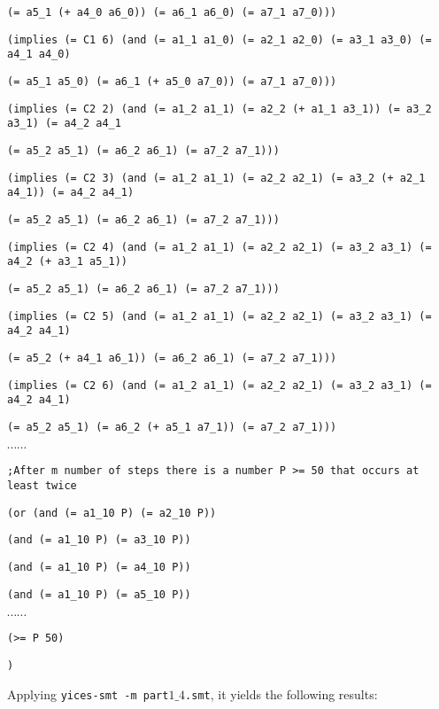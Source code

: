 {{\tt  (= a5\_1 (+ a4\_0 a6\_0)) (= a6\_1 a6\_0) (= a7\_1 a7\_0)))}

{\tt (implies (= C1 6)  (and (= a1\_1 a1\_0) (= a2\_1 a2\_0) (= a3\_1 a3\_0) (= a4\_1 a4\_0) }

{\tt (= a5\_1 a5\_0) (= a6\_1 (+ a5\_0 a7\_0)) (= a7\_1 a7\_0)))}

{\tt }

{\tt (implies (= C2 2)  (and (= a1\_2 a1\_1) (= a2\_2 (+ a1\_1 a3\_1)) (= a3\_2 a3\_1) (= a4\_2 a4\_1}

{\tt  (= a5\_2 a5\_1) (= a6\_2 a6\_1) (= a7\_2 a7\_1)))}

{\tt (implies (= C2 3)  (and (= a1\_2 a1\_1) (= a2\_2 a2\_1) (= a3\_2 (+ a2\_1 a4\_1)) (= a4\_2 a4\_1)}

{\tt  (= a5\_2 a5\_1) (= a6\_2 a6\_1) (= a7\_2 a7\_1)))}

{\tt (implies (= C2 4)  (and (= a1\_2 a1\_1) (= a2\_2 a2\_1) (= a3\_2 a3\_1) (= a4\_2 (+ a3\_1 a5\_1))}

{\tt (= a5\_2 a5\_1) (= a6\_2 a6\_1) (= a7\_2 a7\_1)))}

{\tt (implies (= C2 5)  (and (= a1\_2 a1\_1) (= a2\_2 a2\_1) (= a3\_2 a3\_1) (= a4\_2 a4\_1)}

{\tt (= a5\_2 (+ a4\_1 a6\_1)) (= a6\_2 a6\_1) (= a7\_2 a7\_1)))}

{\tt (implies (= C2 6)  (and (= a1\_2 a1\_1) (= a2\_2 a2\_1) (= a3\_2 a3\_1) (= a4\_2 a4\_1)}

{\tt (= a5\_2 a5\_1) (= a6\_2 (+ a5\_1 a7\_1)) (= a7\_2 a7\_1)))}

$\cdots \cdots$

{\tt ;After m number of steps there is a number P >= 50 that occurs at least twice }

{\tt  (or  (and (= a1\_10 P) (= a2\_10 P))}

{\tt (and (= a1\_10 P) (= a3\_10 P))}

 {\tt (and (= a1\_10 P) (= a4\_10 P))}

 {\tt (and (= a1\_10 P) (= a5\_10 P))}


$\cdots \cdots$

{\tt (>= P 50)}

{\tt )}
}

\vspace{3mm}

Applying {\tt yices-smt -m part$1\_4$.smt}, it yields the following results:

